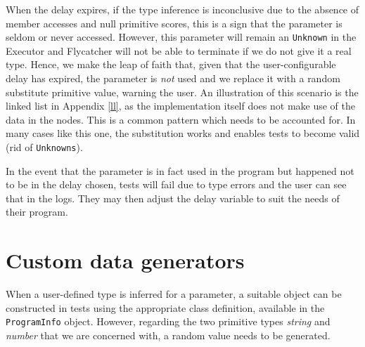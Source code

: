 
When the delay expires, if the type inference is inconclusive due to the absence of member accesses and null primitive scores, this is a sign that the parameter is seldom or never accessed. However, this parameter will remain an \texttt{Unknown} in the \textsf{Executor} and \textsf{Flycatcher} will not be able to terminate if we do not give it a real type. Hence, we make the leap of faith that, given that the user-configurable delay has expired, the parameter is \emph{not} used and we replace it with a random substitute primitive value, warning the user. An illustration of this scenario is the linked list in Appendix \ref{ll}, as the implementation itself does not make use of the data in the nodes. This is a common pattern which needs to be accounted for. In many cases like this one, the substitution works and enables tests to become valid (rid of \texttt{Unknowns}).



In the event that the parameter is in fact used in the program but happened not to be in the delay chosen, tests will fail due to type errors and the user can see that in the logs. They may then adjust the delay variable to suit the needs of their program.

\section{Custom data generators}
When a user-defined type is inferred for a parameter, a suitable object can be constructed in tests using the appropriate class definition, available in the \texttt{ProgramInfo} object. However, regarding the two primitive types \emph{string} and \emph{number} that we are concerned with, a random value needs to be generated.

